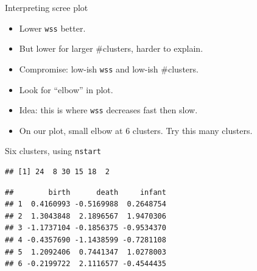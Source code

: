 \documentclass[ignorenonframetext,]{beamer}
\newenvironment{Shaded}{\begin{snugshade}}{\end{snugshade}}
\newcommand{\DataTypeTok}[1]{\textcolor[rgb]{0.13,0.29,0.53}{#1}}
\newcommand{\DecValTok}[1]{\textcolor[rgb]{0.00,0.00,0.81}{#1}}
\newcommand{\KeywordTok}[1]{\textcolor[rgb]{0.13,0.29,0.53}{\textbf{#1}}}
\newcommand{\NormalTok}[1]{#1}
\newcommand{\OperatorTok}[1]{\textcolor[rgb]{0.81,0.36,0.00}{\textbf{#1}}}
\newcommand{\StringTok}[1]{\textcolor[rgb]{0.31,0.60,0.02}{#1}}
\begin{document}
\begin{frame}[fragile]{Interpreting scree plot}
\protect\hypertarget{interpreting-scree-plot}{}

\begin{itemize}
\item
  Lower \texttt{wss} better.
\item
  But lower for larger \#clusters, harder to explain.
\item
  Compromise: low-ish \texttt{wss} and low-ish \#clusters.
\item
  Look for ``elbow'' in plot.
\item
  Idea: this is where \texttt{wss} decreases fast then slow.
\item
  On our plot, small elbow at 6 clusters. Try this many clusters.
\end{itemize}

\end{frame}

\begin{frame}[fragile]{Six clusters, using \texttt{nstart}}
\protect\hypertarget{six-clusters-using-nstart}{}

\begin{Shaded}
\end{Shaded}

\begin{verbatim}
## [1] 24  8 30 15 18  2
\end{verbatim}

\begin{Shaded}
\end{Shaded}

\begin{verbatim}
##        birth      death     infant
## 1  0.4160993 -0.5169988  0.2648754
## 2  1.3043848  2.1896567  1.9470306
## 3 -1.1737104 -0.1856375 -0.9534370
## 4 -0.4357690 -1.1438599 -0.7281108
## 5  1.2092406  0.7441347  1.0278003
## 6 -0.2199722  2.1116577 -0.4544435
\end{verbatim}

\end{frame}
\end{document}
